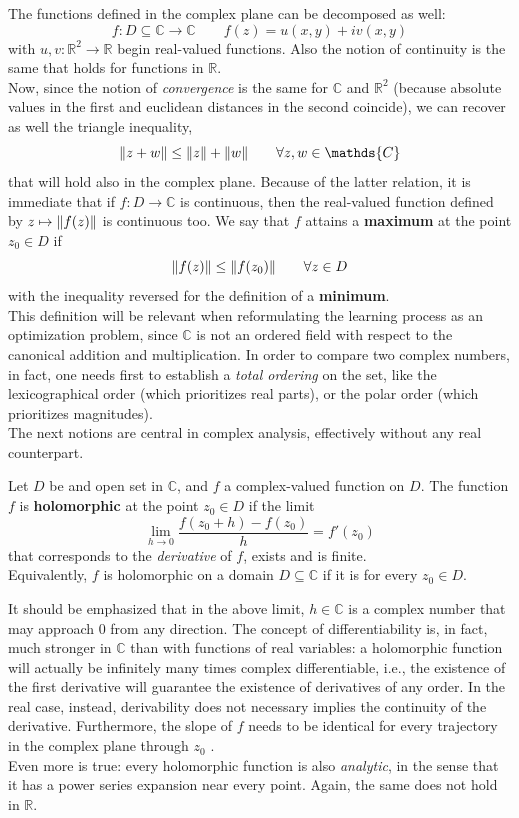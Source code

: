 \documentclass[../main.tex]{subfiles}
\begin{document}
The functions defined in the complex plane can be decomposed as well:
\[ f:D\subseteq\mathds{C}\to\mathds{C} \qquad f(z) = u(x,y) + iv(x,y) \]
with $u,v:\mathds{R}^2\to\mathds{R}$ begin real-valued functions. Also the notion of continuity is the same that holds for functions in $\mathds{R}$.\\
Now, since the notion of \textit{convergence} is the same for $\mathds{C}$ and $\mathds{R}^2$ (because absolute values in the first and euclidean distances in the second coincide), we can recover as well the triangle inequality, 
\[ \norm{z + w} \leq \norm{z} + \norm{w} \qquad \forall z,w\in\mathds{C} \]
that will hold also in the complex plane. Because of the latter relation, it is immediate that if $f:D\to\mathds{C}$ is continuous, then the real-valued function defined by $z\mapsto\norm{f(z)}$ is continuous too. We say that $f$ attains a \textbf{maximum} at the point $z_0 \in D$ if 
\[ \norm{f(z)} \leq \norm{f(z_0)} \qquad \forall z\in D \]
with the inequality reversed for the definition of a \textbf{minimum}.\\
This definition will be relevant when reformulating the learning process as an optimization problem, since $\mathds{C}$ is not an ordered field with respect to the canonical addition and multiplication. In order to compare two complex numbers, in fact, one needs first to establish a \textit{total ordering} on the set, like the lexicographical order (which prioritizes real parts), or the polar order (which prioritizes magnitudes).\\
The next notions are central in complex analysis, effectively without any real counterpart.
\begin{definition}
Let $D$ be and open set in $\mathds{C}$, and $f$ a complex-valued function on $D$. The function $f$ is \textbf{holomorphic} at the point $z_0\in D$ if the limit
\[ \lim_{h\to 0}\frac{f(z_0 + h) - f(z_0)}{h} = f'(z_0) \]
that corresponds to the \textit{derivative} of $f$, exists and is finite.\\
Equivalently, $f$ is holomorphic on a domain $D\subseteq{\mathds{C}}$ if it is for every $z_0\in D$.
\label{def:cmplx_der}
\end{definition}
It should be emphasized that in the above limit, $h\in\mathds{C}$ is a complex number that may approach 0 from any direction. The concept of differentiability is, in fact, much stronger in $\mathds{C}$ than with functions of real variables: a holomorphic function will actually be infinitely many times complex differentiable, i.e., the existence
of the first derivative will guarantee the existence of derivatives of any order. In the real case, instead, derivability does not necessary implies the continuity of the derivative. Furthermore, the slope of $f$ needs to be identical for every trajectory in the complex plane through $z_0$ \cite{Messerschmitt_stationary_points}. \\
Even more is true: every holomorphic function is also \textit{analytic}, in the sense that it has a
power series expansion near every point. Again, the same does not hold in $\mathds{R}$.
\end{document}
